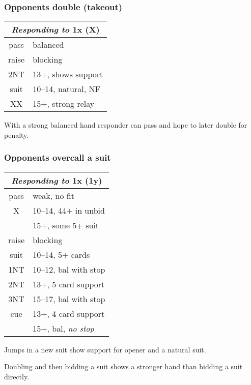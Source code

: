 \documentclass[a4paper, twoside, 11pt]{article}
\begin{document}
\begin{multicols}{3}
\subsubsection*{Opponents double (takeout)}

\begin{center}
\begin{tabular}{ |c|l| }
 \hline
 \multicolumn{2}{|c|}{\textit{Responding to} 1x (X)} \\
 \hline
 pass & balanced\\
 raise &  blocking\\
 2NT & 13+, shows support\\
 suit & 10--14, natural, NF\\
 XX & 15+, strong relay\\
 \hline
\end{tabular}
\end{center}

With a strong balanced hand responder can pass and hope to later double for penalty.

\subsubsection*{Opponents overcall a suit}

\begin{center}
\begin{tabular}{ |c|l| }
 \hline
 \multicolumn{2}{|c|}{\textit{Responding to} 1x (1y)} \\
 \hline
 pass & weak, no fit \\
 X & 10--14, 44+ in unbid\\
  & 15+, some 5+ suit\\
 raise &  blocking\\
 suit & 10--14, 5+ cards\\
 1NT & 10--12, bal with stop \\
 2NT & 13+, 5 card support\\
 3NT & 15--17, bal with stop \\
 cue & 13+, 4 card support \\
     & 15+, bal, \textit{no stop}\\
 \hline
\end{tabular}
\end{center}

Jumps in a new suit show support for opener and a natural suit.

Doubling and then bidding a suit shows a stronger hand than bidding a suit directly.





\end{multicols}
\end{document}
